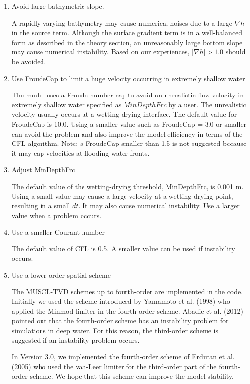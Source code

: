 \documentclass[11pt]{article}
\begin{document}
\begin{enumerate}

\item Avoid large bathymetric slope. 

A rapidly varying bathymetry may cause numerical noises due to a large $\nabla h$ in the source term. Although the surface gradient term is in a well-balanced form as described in the theory section, an unreasonably large bottom slope may  cause numerical instability. Based on our experiences, $|\nabla h| > 1.0$ should be avoided. 

\item Use FroudeCap to limit a huge velocity occurring in extremely shallow water

The model uses a Froude number cap to avoid an unrealistic flow velocity in extremely shallow water specified as $MinDepthFrc$ by a user.  The unrealistic velocity usually occurs at a wetting-drying interface. The default value for FroudeCap is 10.0. Using a smaller value such as FroudeCap = 3.0 or smaller can avoid the problem and also improve the model efficiency in terms of the CFL algorithm. 
 Note: a FroudeCap smaller than 1.5 is not suggested because it may cap velocities at flooding water fronts. 

\item  Adjust MinDepthFrc

The default value of the wetting-drying threshold, MinDepthFrc,  is 0.001 m. Using a small value may cause a large velocity at a wetting-drying point, resulting in a small $dt$. It may also cause numerical instability. Use a larger value when a problem occurs. 

\item Use a smaller Courant number

The default value of CFL is 0.5. A smaller value can be used if instability occurs. 

\item Use a lower-order spatial scheme

The MUSCL-TVD schemes up to fourth-order are implemented in the code. Initially we used the scheme introduced by Yamamoto et al. (1998) who applied the Minmod limiter in the fourth-order scheme. Abadie et al. (2012) pointed out that the fourth-order scheme  has an instability problem for simulations in deep water. For this reason, the third-order scheme is suggested if an instability problem occurs. 

In Version 3.0, we implemented the fourth-order scheme of Erduran et al. (2005) who 
used the van-Leer limiter for the third-order part of the fourth-order scheme. We hope that this scheme can improve the model stability. 

\end{enumerate}
\end{document}
